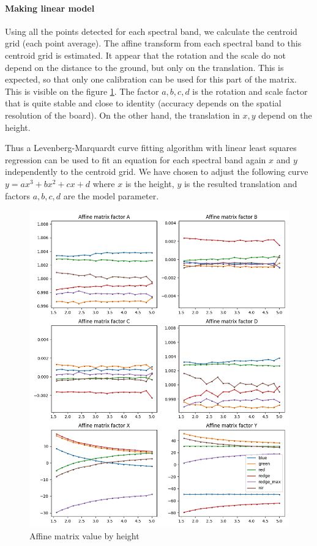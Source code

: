 \documentclass[]{elsarticle}
\begin{document}
	\paragraph{Making linear model}
	Using all the points detected for each spectral band, we calculate the centroid grid (each point average).
	The affine transform from each spectral band to this centroid grid is estimated.
	It appear that the rotation and the scale do not depend on the distance to the ground, but only on the translation.
	This is expected, so that only one calibration can be used for this part of the matrix.
	This is visible on the figure \ref{fig:affine-translation-height}.
	The factor $a,b,c,d$ is the rotation and scale factor that is quite stable and close to identity (accuracy depends on the spatial resolution of the board).
	On the other hand, the translation in $x, y$ depend on the height.
	
	Thus a Levenberg-Marquardt curve fitting algorithm with linear least squares regression \cite{More78}
	can be used to fit an equation for each spectral band again $x$ and $y$ independently to the centroid grid.
	We have chosen to adjust the following curve $y = ax^3 + bx^2 + cx + d$ where $x$ is the height,
	$y$ is the resulted translation and factors $a,b,c,d$ are the model parameter.
	
	\begin{figure}[!htb]
		\centering
		\includegraphics[width=\linewidth]{../figures/affine-translation-height.png}
		\caption{Affine matrix value by height}
		\label{fig:affine-translation-height}
	\end{figure}
	
\end{document}
